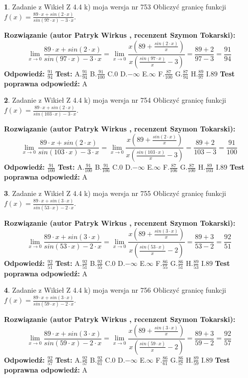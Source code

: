 \documentclass[12pt, a4paper]{article}
\theoremstyle{definition} %
\newtheorem{zad}{}
\newcommand{\zadStart}[1]{\begin{zad}#1\newline}
\newcommand{\zadStop}{\end{zad}}
\newcommand{\rozwStart}[2]{\noindent \textbf{Rozwiązanie (autor #1 , recenzent #2): }\newline}
\newcommand{\rozwStop}{\newline}
\newcommand{\odpStart}{\noindent \textbf{Odpowiedź:}\newline}
\newcommand{\odpStop}{\newline}
\newcommand{\testStart}{\noindent \textbf{Test:}\newline}
\newcommand{\testStop}{\newline}
\newcommand{\kluczStart}{\noindent \textbf{Test poprawna odpowiedź:}\newline}
\newcommand{\kluczStop}{\newline}
\begin{document}
\zadStart{Zadanie z Wikieł Z 4.4 k) moja wersja nr 753}
Obliczyć granicę funkcji $f(x)=\frac{89\cdot x +sin(2\cdot x)}{sin(97\cdot x) -3\cdot x}$.
\zadStop
\rozwStart{Patryk Wirkus}{Szymon Tokarski}
$$\lim\limits_{x\to 0}\frac{89\cdot x +sin(2\cdot x)}{sin(97\cdot x) -3\cdot x}
=\lim\limits_{x\to 0}\frac{x(89+\frac{sin(2\cdot x)}{x})}{x(\frac{sin(97\cdot x)}{x}-3)}
=\frac{89+2}{97-3} = \frac{91}{94}$$
\rozwStop
\odpStart
$\frac{91}{94}$
\odpStop
\testStart
A.$\frac{91}{94}$
B.$\frac{91}{100}$
C.$0$
D.$-\infty$
E.$\infty$
F.$\frac{87}{100}$
G.$\frac{87}{94}$
H.$\frac{89}{97}$
I.$89$
\testStop
\kluczStart
A
\kluczStop



\zadStart{Zadanie z Wikieł Z 4.4 k) moja wersja nr 754}
Obliczyć granicę funkcji $f(x)=\frac{89\cdot x +sin(2\cdot x)}{sin(103\cdot x) -3\cdot x}$.
\zadStop
\rozwStart{Patryk Wirkus}{Szymon Tokarski}
$$\lim\limits_{x\to 0}\frac{89\cdot x +sin(2\cdot x)}{sin(103\cdot x) -3\cdot x}
=\lim\limits_{x\to 0}\frac{x(89+\frac{sin(2\cdot x)}{x})}{x(\frac{sin(103\cdot x)}{x}-3)}
=\frac{89+2}{103-3} = \frac{91}{100}$$
\rozwStop
\odpStart
$\frac{91}{100}$
\odpStop
\testStart
A.$\frac{91}{100}$
B.$\frac{91}{106}$
C.$0$
D.$-\infty$
E.$\infty$
F.$\frac{87}{106}$
G.$\frac{87}{100}$
H.$\frac{89}{103}$
I.$89$
\testStop
\kluczStart
A
\kluczStop



\zadStart{Zadanie z Wikieł Z 4.4 k) moja wersja nr 755}
Obliczyć granicę funkcji $f(x)=\frac{89\cdot x +sin(3\cdot x)}{sin(53\cdot x) -2\cdot x}$.
\zadStop
\rozwStart{Patryk Wirkus}{Szymon Tokarski}
$$\lim\limits_{x\to 0}\frac{89\cdot x +sin(3\cdot x)}{sin(53\cdot x) -2\cdot x}
=\lim\limits_{x\to 0}\frac{x(89+\frac{sin(3\cdot x)}{x})}{x(\frac{sin(53\cdot x)}{x}-2)}
=\frac{89+3}{53-2} = \frac{92}{51}$$
\rozwStop
\odpStart
$\frac{92}{51}$
\odpStop
\testStart
A.$\frac{92}{51}$
B.$\frac{92}{55}$
C.$0$
D.$-\infty$
E.$\infty$
F.$\frac{86}{55}$
G.$\frac{86}{51}$
H.$\frac{89}{53}$
I.$89$
\testStop
\kluczStart
A
\kluczStop



\zadStart{Zadanie z Wikieł Z 4.4 k) moja wersja nr 756}
Obliczyć granicę funkcji $f(x)=\frac{89\cdot x +sin(3\cdot x)}{sin(59\cdot x) -2\cdot x}$.
\zadStop
\rozwStart{Patryk Wirkus}{Szymon Tokarski}
$$\lim\limits_{x\to 0}\frac{89\cdot x +sin(3\cdot x)}{sin(59\cdot x) -2\cdot x}
=\lim\limits_{x\to 0}\frac{x(89+\frac{sin(3\cdot x)}{x})}{x(\frac{sin(59\cdot x)}{x}-2)}
=\frac{89+3}{59-2} = \frac{92}{57}$$
\rozwStop
\odpStart
$\frac{92}{57}$
\odpStop
\testStart
A.$\frac{92}{57}$
B.$\frac{92}{61}$
C.$0$
D.$-\infty$
E.$\infty$
F.$\frac{86}{61}$
G.$\frac{86}{57}$
H.$\frac{89}{59}$
I.$89$
\testStop
\kluczStart
A
\kluczStop
\end{document}
